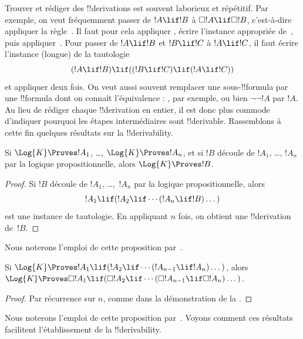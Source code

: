 \documentclass[../../../include/open-logic-section]{subfiles}
\begin{document}


Trouver et rédiger des !!{derivation}s est souvent laborieux et
répétitif. Par exemple, on veut fréquemment passer de $!A \lif !B$ à
$\Box !A \lif \Box !B$, c'est-à-dire appliquer la règle~\RK. Il faut
pour cela appliquer \Nec, écrire l'instance appropriée de~,
puis appliquer~\MP. Pour passer de $!A \lif !B$ et $!B \lif !C$ à
$!A \lif !C$, il faut écrire l'instance (longue) de la tautologie
\[
(!A \lif !B) \lif ((!B \lif !C) \lif (!A \lif !C))
\]
et appliquer \MP{} deux fois. On veut aussi souvent remplacer une
sous-!!{formula} par une !!{formula} dont on connaît l'équivalence :
, par exemple, ou bien
$\lnot\lnot !A$ par $!A$. Au lieu de rédiger chaque !!{derivation}
en entier, il est donc plus commode d'indiquer pourquoi les étapes
intermédiaires sont !!{derivable}. Rassemblons à cette fin quelques
résultats sur la !!{derivability}.

\begin{prop}
  Si $\Log{K} \Proves !A_1$, \dots, $\Log{K} \Proves !A_n$, et si $!B$
  découle de $!A_1$, \dots, $!A_n$ par la logique propositionnelle,
  alors $\Log{K} \Proves !B$.
\end{prop}

\begin{proof}
  Si $!B$ découle de $!A_1$, \dots,~$!A_n$ par la logique
  propositionnelle, alors
  \[
  !A_1 \lif (!A_2 \lif \cdots (!A_n \lif !B)\dots)
  \]
  est une instance de tautologie. En appliquant \MP{} $n$ fois, on
  obtient une !!{derivation} de~$!B$.
\end{proof}

Nous noterons l'emploi de cette proposition par~\PL.

\begin{prop}
  Si $\Log{K} \Proves !A_1 \lif (!A_2 \lif \cdots (!A_{n-1} \lif
  !A_n)\dots)$, alors $\Log{K} \Proves \Box !A_1 \lif (\Box !A_2 \lif
  \cdots (\Box !A_{n-1} \lif \Box !A_n)\dots)$.
\end{prop}

\begin{proof}
  Par récurrence sur $n$, comme dans la démonstration de la
  .
\end{proof}

Nous noterons l'emploi de cette proposition par~\RK. Voyons comment
ces résultats facilitent l'établissement de la !!{derivability}.
\end{document}
